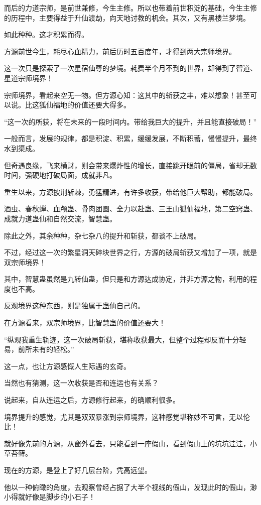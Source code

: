 \begin{this_body}
而后的力道宗师，是前世兼修，今生主修。所以也带着前世积淀的基础，今生主修的历程中，主要得益于升仙渡劫，向天地讨教的机会。其次，又有黑楼兰梦境。

如此种种。这才积累而得。

方源前世今生，耗尽心血精力，前后历时五百度年，才得到两大宗师境界。

这一次只是探索了一次星宿仙尊的梦境。耗费半个月不到的世界，却得到了智道、星道宗师境界！

宗师境界，看起来空无一物。但方源心知：这其中的斩获之丰，难以想象！甚至可以说。比这狐仙福地的价值还要大得多。

“这一次的所获，将在未来的一段时间内。带给我巨大的提升，并且能直接破局！”

一般而言，发展的规律，都是积淀、积累，缓缓发展，不断积蓄，慢慢提升，最终水到渠成。

但奇遇良缘，飞来横财，则会带来爆炸性的增长，直接跳开眼前的僵局，省却无数时间，强硬地打破局面，成就非凡。

重生以来，方源披荆斩棘，勇猛精进，有许多收获，带给他巨大帮助，都能破局。

酒虫、春秋蝉、血颅蛊、骨肉团圆、全力以赴蛊、三王山狐仙福地，第二空窍蛊、成就力道蛊仙和自然交流，智慧蛊。

除此之外，其余种种，杂七杂八的提升和斩获，都谈不上破局。

不过，经过这一次的繁星洞天碎块世界之行，方源的破局斩获又增加了一项，就是双宗师境界！

其中，智慧蛊虽然是九转仙蛊，但只是和方源达成协定，并非方源之物，利用的程度也不高。

反观境界这种东西，则是独属于蛊仙自己的。

在方源看来，双宗师境界，比智慧蛊的价值还要大！

“纵观我重生轨迹，这一次破局斩获，堪称收获最大，但整个过程却反而十分轻易，前所未有的轻松。”

这一点，也让方源感慨人生际遇的玄奇。

当然也有猜测，这一次收获是否和连运也有关系？

说起来，自从连运之后，方源修行起来，的确顺利很多。

境界提升的感觉，尤其是双双暴涨到宗师境界，这种感觉堪称妙不可言，无以伦比！

就好像先前的方源，从窗外看去，只能看到一座假山，看到假山上的坑坑洼洼，小草苔藓。

现在的方源，是登上了好几层台阶，凭高远望。

他以一种俯瞰的角度，去观察曾经占据了大半个视线的假山，发现此时的假山，渺小得就好像是脚步的小石子！


\end{this_body}
